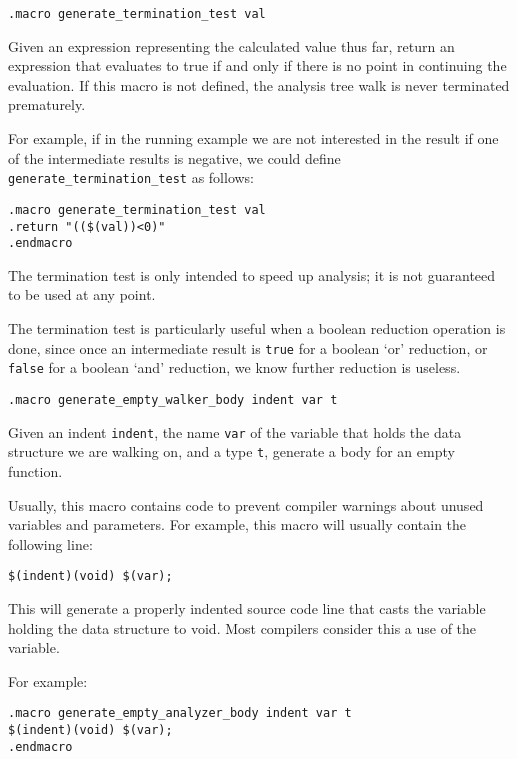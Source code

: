 \begin{verbatim}
.macro generate_termination_test val
\end{verbatim}
\begin{desc}
Given an expression representing the calculated value thus far, return
an expression that evaluates to true if and only if there is no point
in continuing the evaluation. If this macro is not defined, the analysis
tree walk is never terminated prematurely.
\par
For example, if in the running example we are not interested in the
result if one of the intermediate results is negative, we could define
\verb'generate_termination_test' as follows:
\begin{verbatim}
.macro generate_termination_test val
.return "(($(val))<0)"
.endmacro
\end{verbatim}
The termination test is only intended to speed up analysis; it is not
guaranteed to be used at any point.
\par
The termination test is particularly useful when a boolean reduction
operation is done, since once an intermediate result is {\tt true} for
a boolean `or' reduction, or {\tt false} for a boolean `and' reduction,
we know further reduction is useless.
\end{desc}
\begin{verbatim}
.macro generate_empty_walker_body indent var t
\end{verbatim}
\begin{desc}
Given an indent \verb'indent', the name \verb'var' of the variable
that holds the data structure we are walking on, and a type \verb't',
generate a body for an empty function.

Usually, this macro contains code to prevent compiler warnings about
unused variables and parameters.  For example, this macro will usually
contain the following line:
\begin{verbatim}
$(indent)(void) $(var);
\end{verbatim}
This will generate a properly indented source code line that casts the
variable holding the data structure to void. Most compilers consider
this a use of the variable.
\par
For example:
\begin{verbatim}
.macro generate_empty_analyzer_body indent var t
$(indent)(void) $(var);
.endmacro
\end{verbatim}
\end{desc}
